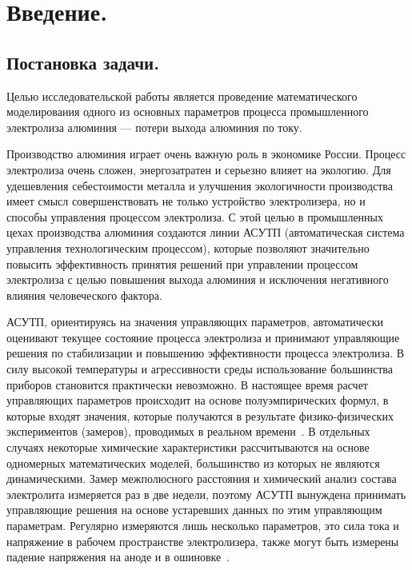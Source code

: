 \documentclass{article}
\begin{document}


\newpage

\addto{}

\setcounter{tocdepth}{5}
\tableofcontents

\newpage

\section*{Введение.}

\subsection*{Постановка задачи.}

Целью исследовательской работы является проведение математического моделирования одного из основных параметров процесса промышленного электролиза алюминия — потери выхода алюминия по току.

Производство алюминия играет очень важную роль в экономике России. Процесс электролиза очень сложен, энергозатратен и серьезно влияет на экологию. Для удешевления себестоимости металла и улучшения экологичности производства имеет смысл совершенствовать не только устройство электролизера, но и способы управления процессом электролиза. С этой целью в промышленных цехах производства алюминия создаются линии АСУТП (автоматическая система управления технологическим процессом), которые позволяют значительно повысить эффективность принятия решений при управлении процессом электролиза с целью повышения выхода алюминия и исключения негативного влияния человеческого фактора.

АСУТП, ориентируясь на значения управляющих параметров, автоматически оценивают текущее состояние процесса электролиза и принимают управляющие решения по стабилизации и повышению эффективности процесса электролиза. В силу высокой температуры и агрессивности среды использование большинства приборов становится практически невозможно. В настоящее время расчет управляющих параметров происходит на основе полуэмпирических формул, в которые входят значения, которые получаются в результате физико-физических экспериментов (замеров), проводимых в реальном времени~\cite{litlink:kalmykov}. В отдельных случаях некоторые химические характеристики рассчитываются на основе одномерных математических моделей, большинство из которых не являются динамическими. Замер межполюсного расстояния и химический анализ состава электролита измеряется раз в две недели, поэтому АСУТП вынуждена принимать управляющие решения на основе устаревших данных по этим управляющим параметрам. Регулярно измеряются лишь несколько параметров, это сила тока и напряжение в рабочем пространстве электролизера, также могут быть измерены падение напряжения на аноде и в ошиновке~\cite{litlink:bibliogr}.
\end{document}
